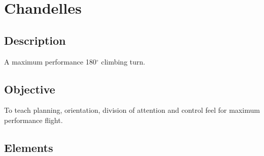 \section{Chandelles}

\subsection{Description}

A maximum performance 180$^\circ$ climbing turn.

\subsection{Objective}

To teach planning, orientation, division of attention and control feel for
maximum performance flight.

\subsection{Elements}

